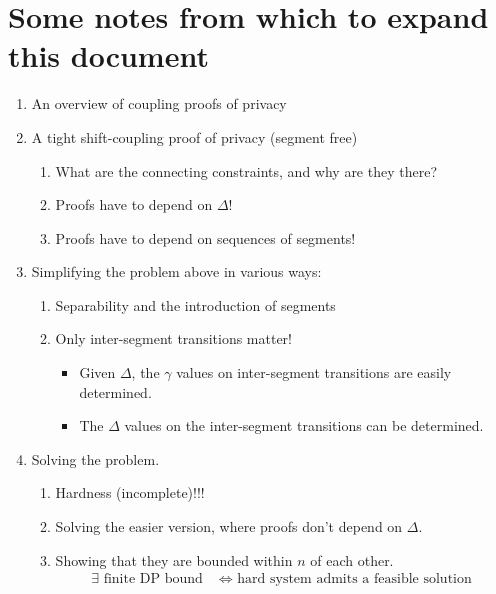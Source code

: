 \documentclass{article}
\newcommand{\1}{\langle 1 \rangle}
\newcommand{\2}{\langle 2 \rangle}
\begin{document}
\tableofcontents

\section{Some notes from which to expand this document}

\begin{enumerate}
    \item An overview of coupling proofs of privacy
    \item A tight shift-coupling proof of privacy (segment free)
    \begin{enumerate}
        \item What are the connecting constraints, and why are they there?
        \item Proofs have to depend on $\Delta$!
        \item Proofs have to depend on sequences of segments! 
    \end{enumerate}
    \item Simplifying the problem above in various ways: 
    \begin{enumerate}
        \item Separability and the introduction of segments
        \item Only inter-segment transitions matter! 
        \begin{itemize}
            \item Given $\Delta$, the $\gamma$ values on inter-segment transitions are easily determined. 
            \item The $\Delta$ values on the inter-segment transitions can be determined. 
        \end{itemize}
    \end{enumerate}
    \item Solving the problem.
    \begin{enumerate}
        \item Hardness (incomplete)!!!
        \item Solving the easier version, where proofs don't depend on $\Delta$.
        \item Showing that they are bounded within $n$ of each other. 
        \begin{align*}
            \exists \text{ finite DP bound } &\iff \text{ hard system admits a feasible solution }
        \end{align*}
    \end{enumerate}
\end{enumerate}
\end{document}
